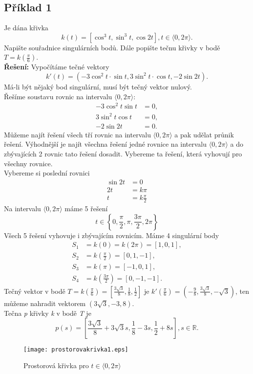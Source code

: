 \subsection*{Příklad 1}
Je dána křivka
$$k(t) = [\cos^3{t}, \sin^3{t}, \cos{2t}], t \in \langle0, 2\pi\rangle.$$
Napište souřadnice singulárních bodů. Dále popište tečnu křivky v bodě $T=k\left(\frac{\pi}{6}\right)$. \\[10pt]
\textbf{Řešení:} Vypočítáme tečné vektory
$$k'(t)=(-3 \cos^2{t} \cdot \sin{t}, 3 \sin^2{t} \cdot \cos{t}, -2\sin{2t}).$$
Má-li být nějaký bod singulární, musí být tečný vektor nulový. \\
Řešíme soustavu rovnic na intervalu $\langle0,2\pi\rangle$:
\begin{align*}
	-3\cos^2{t}\sin{t} & = 0, \\
	3\sin^2{t}\cos{t}  & = 0, \\
	-2\sin{2t}         & = 0. 
\end{align*}
Můžeme najít řešení všech tří rovnic na intervalu $\langle0,2\pi\rangle$ a pak udělat průnik řešení. Výhodnější je
najít všechna řešení jedné rovnice na intervalu $\langle0,2\pi\rangle$ a do zbývajících 2 rovnic tato řešení dosadit.
Vybereme ta řešení, která vyhovují pro všechny rovnice. \\
Vybereme si poslední rovnici
\begin{align*}
	\sin{2t} & = 0              \\
	2t       & = k\pi           \\
	t        & = k\frac{\pi}{2} 
\end{align*}
Na intervalu $\langle0,2\pi\rangle$ máme 5 řešení
$$t \in \left\{0, \frac{\pi}{2}, \pi, \frac{3\pi}{2}, 2\pi\right\}$$
Všech 5 řešení vyhovuje i zbývajícím rovnicím. Máme 4 singulární body
\begin{align*}
	S_1 & = k(0) = k(2\pi)=[1,0,1],                   \\
	S_2 & = k\left(\frac{\pi}{2}\right) = [0,1,-1],   \\
	S_3 & = k(\pi) = [-1,0,1],                        \\
	S_4 & = k\left(\frac{3\pi}{2}\right) = [0,-1,-1]. 
\end{align*}
Tečný vektor v bodě $T=k\left(\frac{\pi}{6}\right)=\left[\frac{3\sqrt{3}}{8}, \frac{1}{8}, \frac{1}{2}\right]$
je $k'\left(\frac{\pi}{6}\right)=\left(-\frac{9}{8},\frac{3\sqrt{3}}{8},-\sqrt{3}\right)$, ten můžeme nahradit vektorem $(3\sqrt{3}, -3, 8)$. \\
Tečna \textit{p} křivky \textit{k} v bodě \textit{T} je
$$p(s)=\left[\frac{3\sqrt{3}}{8}+3\sqrt{3}s, \frac{1}{8}-3s, \frac{1}{2}+8s\right], s \in \mathbb{R}.$$
\begin{figure}[H]
	\centering
	\texttt{[image: prostorovakrivka1.eps]}
	\caption{Prostorová křivka  pro $t \in \langle0, 2\pi\rangle$}
	\label{overflow}
\end{figure}
\clearpage
